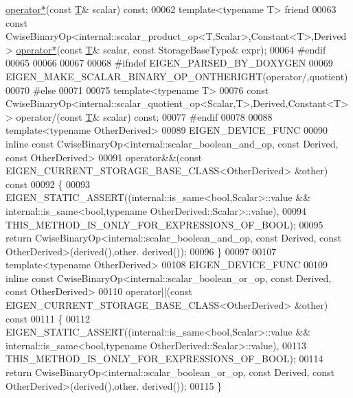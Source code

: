 \begin{DoxyCode}
      \hyperlink{group___geometry___module_ga8f79e131479dbe709ee1173b1be9a8f0}{operator*}(\textcolor{keyword}{const} \hyperlink{group___sparse_core___module_class_eigen_1_1_triplet}{T}& scalar) \textcolor{keyword}{const};
00062 \textcolor{keyword}{template}<\textcolor{keyword}{typename} T> \textcolor{keyword}{friend}
00063 \textcolor{keyword}{const} CwiseBinaryOp<internal::scalar\_product\_op<T,Scalar>,Constant<T>,Derived> 
      \hyperlink{group___geometry___module_ga8f79e131479dbe709ee1173b1be9a8f0}{operator*}(\textcolor{keyword}{const} \hyperlink{group___sparse_core___module_class_eigen_1_1_triplet}{T}& scalar, \textcolor{keyword}{const} StorageBaseType& expr);
00064 \textcolor{preprocessor}{#endif}
00065 
00066 
00067 
00068 \textcolor{preprocessor}{#ifndef EIGEN\_PARSED\_BY\_DOXYGEN}
00069 EIGEN\_MAKE\_SCALAR\_BINARY\_OP\_ONTHERIGHT(\textcolor{keyword}{operator}/,quotient)
00070 \textcolor{preprocessor}{#else}
00071 
00075 \textcolor{keyword}{template}<\textcolor{keyword}{typename} T>
00076 \textcolor{keyword}{const} CwiseBinaryOp<internal::scalar\_quotient\_op<Scalar,T>,Derived,Constant<T> > operator/(\textcolor{keyword}{const} 
      \hyperlink{group___sparse_core___module_class_eigen_1_1_triplet}{T}& scalar) \textcolor{keyword}{const};
00077 \textcolor{preprocessor}{#endif}
00078 
00088 \textcolor{keyword}{template}<\textcolor{keyword}{typename} OtherDerived>
00089 EIGEN\_DEVICE\_FUNC
00090 \textcolor{keyword}{inline} \textcolor{keyword}{const} CwiseBinaryOp<internal::scalar\_boolean\_and\_op, const Derived, const OtherDerived>
00091 operator&&(\textcolor{keyword}{const} EIGEN\_CURRENT\_STORAGE\_BASE\_CLASS<OtherDerived> &other)\textcolor{keyword}{ const}
00092 \textcolor{keyword}{}\{
00093   EIGEN\_STATIC\_ASSERT((internal::is\_same<bool,Scalar>::value && internal::is\_same<bool,typename
       OtherDerived::Scalar>::value),
00094                       THIS\_METHOD\_IS\_ONLY\_FOR\_EXPRESSIONS\_OF\_BOOL);
00095   \textcolor{keywordflow}{return} CwiseBinaryOp<internal::scalar\_boolean\_and\_op, const Derived, const OtherDerived>(derived(),other.
      derived());
00096 \}
00097 
00107 \textcolor{keyword}{template}<\textcolor{keyword}{typename} OtherDerived>
00108 EIGEN\_DEVICE\_FUNC
00109 \textcolor{keyword}{inline} \textcolor{keyword}{const} CwiseBinaryOp<internal::scalar\_boolean\_or\_op, const Derived, const OtherDerived>
00110 operator||(\textcolor{keyword}{const} EIGEN\_CURRENT\_STORAGE\_BASE\_CLASS<OtherDerived> &other)\textcolor{keyword}{ const}
00111 \textcolor{keyword}{}\{
00112   EIGEN\_STATIC\_ASSERT((internal::is\_same<bool,Scalar>::value && internal::is\_same<bool,typename
       OtherDerived::Scalar>::value),
00113                       THIS\_METHOD\_IS\_ONLY\_FOR\_EXPRESSIONS\_OF\_BOOL);
00114   \textcolor{keywordflow}{return} CwiseBinaryOp<internal::scalar\_boolean\_or\_op, const Derived, const OtherDerived>(derived(),other.
      derived());
00115 \}
\end{DoxyCode}
